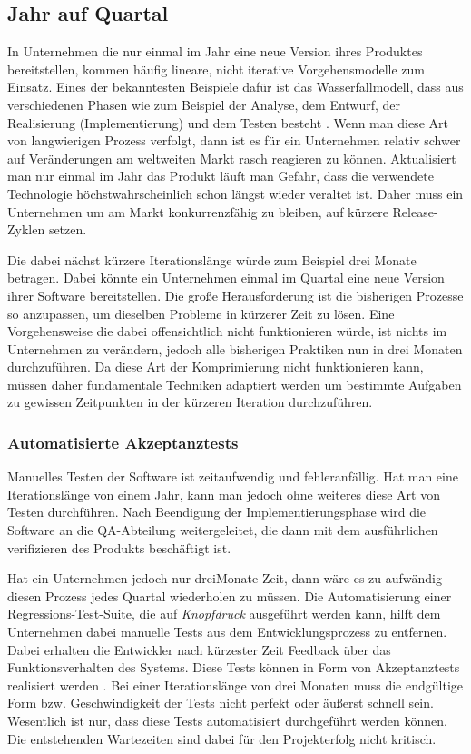 \subsection{Jahr auf Quartal}
\label{subsec:jahr-auf-quartal}

In Unternehmen die nur einmal im Jahr eine neue Version ihres Produktes
bereitstellen, kommen häufig lineare, nicht iterative Vorgehensmodelle zum
Einsatz. Eines der bekanntesten Beispiele dafür ist das Wasserfallmodell, dass
aus verschiedenen Phasen wie zum Beispiel der Analyse, dem Entwurf, der Realisierung
(Implementierung) und dem Testen besteht \cite{Royce:1987:MDL:41765.41801}. Wenn man diese Art von langwierigen Prozess verfolgt, dann ist es für ein Unternehmen relativ schwer auf
Veränderungen am weltweiten Markt rasch reagieren zu können. Aktualisiert man
nur einmal im Jahr das Produkt läuft man Gefahr, dass die verwendete
Technologie höchstwahrscheinlich schon längst wieder veraltet ist. Daher muss
ein Unternehmen um am Markt konkurrenzfähig zu bleiben, auf kürzere Release-
Zyklen setzen.

Die dabei nächst kürzere Iterationslänge würde zum Beispiel drei Monate betragen.
Dabei könnte ein Unternehmen einmal im Quartal eine neue Version ihrer
Software bereitstellen. Die große Herausforderung ist die bisherigen Prozesse
so anzupassen, um dieselben Probleme in kürzerer Zeit zu lösen. Eine
Vorgehensweise die dabei offensichtlich nicht funktionieren würde, ist nichts
im Unternehmen zu verändern, jedoch alle bisherigen Praktiken nun in drei
Monaten durchzuführen. Da diese Art der Komprimierung nicht funktionieren
kann, müssen daher fundamentale Techniken adaptiert werden um bestimmte
Aufgaben zu gewissen Zeitpunkten in der kürzeren Iteration durchzuführen.

\subsubsection{Automatisierte Akzeptanztests}
\label{minisec:automatisierte-akzeptanztests}
Manuelles Testen der Software ist zeitaufwendig und fehleranfällig. Hat man
eine Iterationslänge von einem Jahr, kann man jedoch ohne weiteres diese Art
von Testen durchführen. Nach Beendigung der Implementierungsphase wird die
Software an die QA-Abteilung weitergeleitet, die dann mit dem ausführlichen
verifizieren des Produkts beschäftigt ist. 

Hat ein Unternehmen jedoch nur dreiMonate Zeit, dann wäre es zu aufwändig diesen Prozess jedes Quartal wiederholen zu müssen. Die Automatisierung einer Regressions-Test-Suite, die
auf \emph{Knopfdruck} ausgeführt werden kann, hilft dem Unternehmen dabei
manuelle Tests aus dem Entwicklungsprozess zu entfernen. Dabei erhalten die
Entwickler nach kürzester Zeit Feedback über das Funktionsverhalten des
Systems. Diese Tests können in Form von Akzeptanztests realisiert werden \cite{pugh2010}. Bei
einer Iterationslänge von drei Monaten muss die endgültige Form bzw.
Geschwindigkeit der Tests nicht perfekt oder äußerst schnell sein. Wesentlich
ist nur, dass diese Tests automatisiert durchgeführt werden können. Die
entstehenden Wartezeiten sind dabei für den Projekterfolg nicht kritisch.

